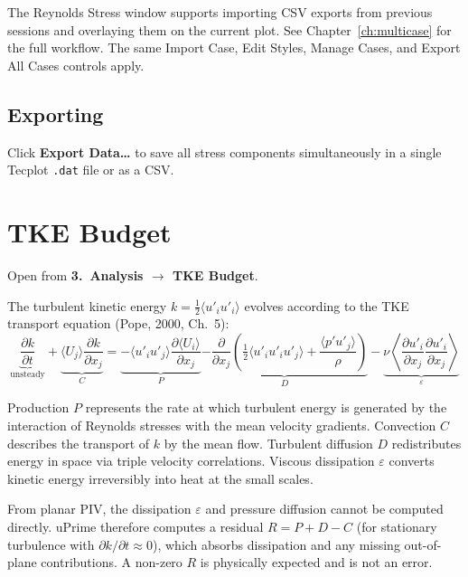 \documentclass[11pt, a4paper]{report}
\newcommand{\uipth}[1]{\textbf{\textcolor{upblue}{#1}}}
\newcommand{\software}[1]{\textsf{#1}}
\begin{document}
The Reynolds Stress window supports importing CSV exports from previous sessions and overlaying them on the current plot. See Chapter~\ref{ch:multicase} for the full workflow. The same Import Case, Edit Styles, Manage Cases, and Export All Cases controls apply.

\section{Exporting}

Click \uipth{Export Data\ldots} to save all stress components simultaneously in a single Tecplot \texttt{.dat} file or as a CSV.

\chapter{TKE Budget}
\label{ch:tke}

Open from \uipth{3.\ Analysis $\to$ TKE Budget}.

The turbulent kinetic energy $k = \tfrac{1}{2}\langle u'_i u'_i \rangle$ evolves according to the TKE transport equation (Pope, 2000, Ch.\ 5):
\[
\underbrace{\frac{\partial k}{\partial t}}_{\text{unsteady}} + \underbrace{\langle U_j \rangle \frac{\partial k}{\partial x_j}}_{C} = \underbrace{-\langle u'_i u'_j \rangle \frac{\partial \langle U_i \rangle}{\partial x_j}}_{P} \underbrace{- \frac{\partial}{\partial x_j}\!\left(\tfrac{1}{2}\langle u'_i u'_i u'_j \rangle + \frac{\langle p' u'_j \rangle}{\rho}\right)}_{D} - \underbrace{\nu \left\langle \frac{\partial u'_i}{\partial x_j}\frac{\partial u'_i}{\partial x_j} \right\rangle}_{\varepsilon}
\]

Production $P$ represents the rate at which turbulent energy is generated by the interaction of Reynolds stresses with the mean velocity gradients. Convection $C$ describes the transport of $k$ by the mean flow. Turbulent diffusion $D$ redistributes energy in space via triple velocity correlations. Viscous dissipation $\varepsilon$ converts kinetic energy irreversibly into heat at the small scales.

From planar PIV, the dissipation $\varepsilon$ and pressure diffusion cannot be computed directly. \software{uPrime} therefore computes a residual $R = P + D - C$ (for stationary turbulence with $\partial k/\partial t \approx 0$), which absorbs dissipation and any missing out-of-plane contributions. A non-zero $R$ is physically expected and is not an error.
\end{document}
